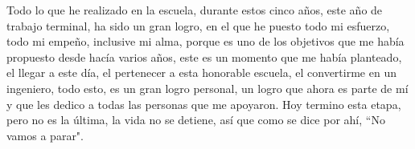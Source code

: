 {{Todo lo que he realizado en la escuela, durante estos cinco años, este año de trabajo terminal, ha sido un gran logro, en el que he puesto todo mi esfuerzo, todo mi empeño, inclusive mi alma, porque es uno de los objetivos que me había propuesto desde hacía varios años, este es un momento que me había planteado, el llegar a este día, el pertenecer a esta honorable escuela, el convertirme en un ingeniero, todo esto, es un gran logro personal, un logro que ahora es parte de mí y que les dedico a todas las personas que me apoyaron. Hoy termino esta etapa, pero no es la última, la vida no se detiene, así que como se dice por ahí, ``No vamos a parar".\\

}}
\begin{flushright}
{\selectfont{\Large Eduardo Adolfo Arroyo López}}
\end{flushright}
\clearpage
\thispagestyle{empty}
\hphantom{1cm}
\pagebreak
